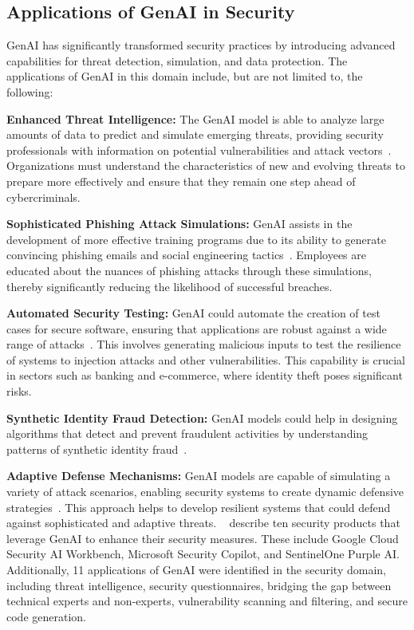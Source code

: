 \subsection{Applications of GenAI in Security}
%
GenAI has significantly transformed security practices by introducing advanced capabilities for threat detection, simulation, and data protection.
The applications of GenAI in this domain include, but are not limited to, the following:

\vspace{1em}
\noindent \textbf{Enhanced Threat Intelligence:} The GenAI model is able to analyze large amounts of data to predict and simulate emerging threats, providing security professionals with information on potential vulnerabilities and attack vectors~\citet{gupta2023chatgpt, alwahedi2024machine}.
Organizations must understand the characteristics of new and evolving threats to prepare more effectively and ensure that they remain one step ahead of cybercriminals.

\vspace{1em}
\noindent \textbf{Sophisticated Phishing Attack Simulations:} GenAI assists in the development of more effective training programs due to its ability to generate convincing phishing emails and social engineering tactics~\citet{bethany2024large}.
Employees are educated about the nuances of phishing attacks through these simulations, thereby significantly reducing the likelihood of successful breaches.

\vspace{1em}
\noindent \textbf{Automated Security Testing:} GenAI could automate the creation of test cases for secure software, ensuring that applications are robust against a wide range of attacks~\citet{hilario2024generative, deng2023pentestgpt}.
This involves generating malicious inputs to test the resilience of systems to injection attacks and other vulnerabilities.
This capability is crucial in sectors such as banking and e-commerce, where identity theft poses significant risks.

\vspace{1em}
\noindent \textbf{Synthetic Identity Fraud Detection:} GenAI models could help in designing algorithms that detect and prevent fraudulent activities by understanding patterns of synthetic identity fraud~\citet{ahmadi2023open}.

\vspace{1em}
\noindent\textbf{Adaptive Defense Mechanisms:} GenAI models are capable of simulating a variety of attack scenarios, enabling security systems to create dynamic defensive strategies~\citet{neupane2023impacts, kucharavy2023fundamentals}.
This approach helps to develop resilient systems that could defend against sophisticated and adaptive threats.
~\citet{sai2024generative} describe ten security products that leverage GenAI to enhance their security measures.
These include Google Cloud Security AI Workbench, Microsoft Security Copilot, and SentinelOne Purple AI.
Additionally, 11 applications of GenAI were identified in the security domain, including threat intelligence, security questionnaires, bridging the gap between technical experts and non-experts, vulnerability scanning and filtering, and secure code generation.
%
